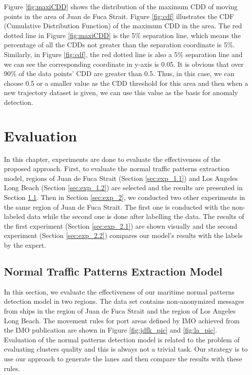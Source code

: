\documentclass[12pt,glossary]{dalcsthesis}
\begin{document}
Figure \ref{fig:maxiCDD} shows the distribution of the maximum CDD of moving points in the area of Juan de Fuca Strait. Figure \ref{fig:cdf} illustrates the CDF (Cumulative Distribution Function) of the maximum CDD in the area. The red dotted line in Figure \ref{fig:maxiCDD} is the 5$\%$ separation line, which means the percentage of all the CDDs not greater than the separation coordinate is 5$\%$. Similarly, in Figure \ref{fig:cdf}, the red dotted line is also a 5$\%$ separation line and we can see the corresponding coordinate in y-axis is 0.05. It is obvious that over 90$\%$ of the data points' CDD are greater than 0.5. Thus, in this case, we can choose 0.5 or a smaller value as the CDD threshold for this area and then when a new trajectory dataset is given, we can use this value as the basis for anomaly detection.







\chapter{Evaluation}
\label{ch:evaluation}
In this chapter, experiments are done to evaluate the effectiveness of the proposed approach. First, to evaluate the normal traffic patterns extraction model, regions of Juan de Fuca Strait (Section \ref{sec:exp_1.1}) and Los Angeles Long Beach (Section \ref{sec:exp_1.2}) are selected and the results are presented in Section \ref{sec:exp_1}. Then in Section \ref{sec:exp_2}, we conducted two other experiments in the same region of Juan de Fuca Strait. The first one is conducted with the non-labeled data while the second one is done after labelling the data. The results of the first experiment (Section \ref{sec:exp_2.1}) are  shown  visually  and  the  second  experiment (Section \ref{sec:exp_2.2}) compares our model’s results with the labels by the expert.

\section{Normal Traffic Patterns Extraction Model}
\label{sec:exp_1}
In this section, we evaluate the effectiveness of our maritime normal patterns detection model in two regions. The data set contains non-anonymized messages from ships in the region of Juan de Fuca Strait and the region of Los Angeles Long Beach. The movement rules for port areas defined by IMO achieved from the IMO publication \cite{anabook} are shown in Figure \ref{fig:jdfk_pic} and \ref{fig:la_pic}. Evaluation of the normal patterns detection model is related to the problem of evaluating clusters quality and this is always not a trivial task. Our strategy is to use our approach to generate the lanes and then compare the results with these rules.
\end{document}
